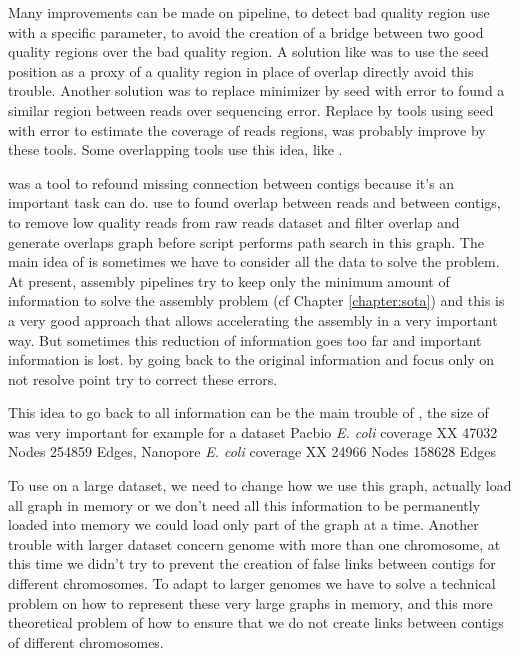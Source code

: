 \documentclass[main.tex]{subfiles}
\begin{document}
Many improvements can be made on \yacrd pipeline, to detect bad quality region \yacrd use \minimap with a specific parameter, to avoid the creation of a bridge between two good quality regions over the bad quality region. A solution like \miniscrub was to use the seed position as a proxy of a quality region in place of overlap directly avoid this trouble. Another solution was to replace minimizer by seed with error to found a similar region between reads over sequencing error. Replace \minimap by tools using seed with error to estimate the coverage of reads regions, was probably improve by these tools. Some overlapping tools use this idea, like \cite{GroupK}. 

\knot was a tool to refound missing connection between contigs because it's an important task \knot can do. \knot use \minimap to found overlap between reads and between contigs, \yacrd to remove low quality reads from raw reads dataset and \fpa filter overlap and generate overlaps graph before \knot script performs path search in this graph. The main idea of \knot is sometimes we have to consider all the data to solve the problem. At present, assembly pipelines try to keep only the minimum amount of information to solve the assembly problem (cf Chapter \ref{chapter:sota}) and this is a very good approach that allows accelerating the assembly in a very important way. But sometimes this reduction of information goes too far and important information is lost. \knot by going back to the original information and focus only on not resolve point try to correct these errors.

\bigskip

This idea to go back to all information can be the main trouble of \knot, the size of \knot \OLC was very important for example for a dataset Pacbio \textit{E. coli} coverage XX 47032 Nodes 254859 Edges, Nanopore \textit{E. coli} coverage XX  24966 Nodes 158628 Edges 

To use \knot on a large dataset, we need to change how we use this graph, actually \knot load all graph in memory or we don't need all this information to be permanently loaded into memory we could load only part of the graph at a time. Another trouble with larger dataset concern genome with more than one chromosome, at this time we didn't try to prevent the creation of false links between contigs for different chromosomes. To adapt \knot to larger genomes we have to solve a technical problem on how to represent these very large graphs in memory, and this more theoretical problem of how to ensure that we do not create links between contigs of different chromosomes.
\end{document}
